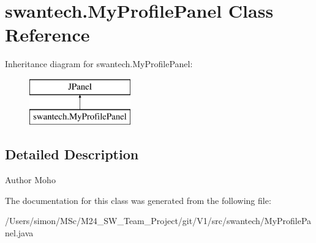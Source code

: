 \hypertarget{classswantech_1_1_my_profile_panel}{}\section{swantech.\+My\+Profile\+Panel Class Reference}
\label{classswantech_1_1_my_profile_panel}
Inheritance diagram for swantech.\+My\+Profile\+Panel\+:\begin{figure}[H]
\begin{center}
\leavevmode
\includegraphics[height=2.000000cm]{classswantech_1_1_my_profile_panel}
\end{center}
\end{figure}


\subsection{Detailed Description}
\begin{DoxyAuthor}{Author}
Moho 
\end{DoxyAuthor}


The documentation for this class was generated from the following file\+:\begin{DoxyCompactItemize}
\item 
/\+Users/simon/\+M\+Sc/\+M24\+\_\+\+S\+W\+\_\+\+Team\+\_\+\+Project/git/\+V1/src/swantech/My\+Profile\+Panel.\+java\end{DoxyCompactItemize}
